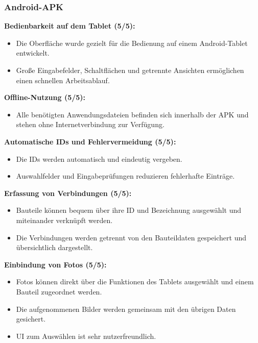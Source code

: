 \newpage

\subsubsection{Android-APK}

\textbf{Bedienbarkeit auf dem Tablet (5/5):}
\begin{itemize}[leftmargin=2em, nosep]
    \item[\pluspunkt] Die Oberfläche wurde gezielt für die Bedienung auf
    einem Android-Tablet entwickelt.
    \item[\pluspunkt] Große Eingabefelder, Schaltflächen und getrennte
    Ansichten ermöglichen einen schnellen Arbeitsablauf.
\end{itemize}

\medskip
\textbf{Offline-Nutzung (5/5):}
\begin{itemize}[leftmargin=2em, nosep]
    \item[\pluspunkt] Alle benötigten Anwendungsdateien befinden sich
    innerhalb der APK und stehen ohne Internetverbindung zur Verfügung.
\end{itemize}

\medskip
\textbf{Automatische IDs und Fehlervermeidung (5/5):}
\begin{itemize}[leftmargin=2em, nosep]
    \item[\pluspunkt] Die IDs werden automatisch und eindeutig vergeben.
    \item[\pluspunkt] Auswahlfelder und Eingabeprüfungen reduzieren
    fehlerhafte Einträge.
\end{itemize}

\medskip
\textbf{Erfassung von Verbindungen (5/5):}
\begin{itemize}[leftmargin=2em, nosep]
    \item[\pluspunkt] Bauteile können bequem über ihre ID und Bezeichnung
    ausgewählt und miteinander verknüpft werden.
    \item[\pluspunkt] Die Verbindungen werden getrennt von den Bauteildaten
    gespeichert und übersichtlich dargestellt.
\end{itemize}

\medskip
\textbf{Einbindung von Fotos (5/5):}
\begin{itemize}[leftmargin=2em, nosep]
    \item[\pluspunkt] Fotos können direkt über die Funktionen des Tablets
    ausgewählt und einem Bauteil zugeordnet werden.
    \item[\pluspunkt] Die aufgenommenen Bilder werden gemeinsam mit den
    übrigen Daten gesichert.
    \item[\pluspunkt] UI zum Auswählen ist sehr nutzerfreundlich.
\end{itemize}

